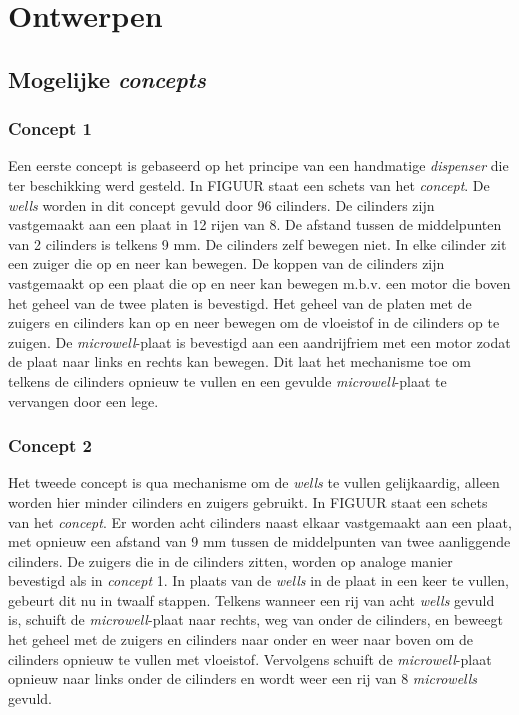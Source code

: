 \documentclass{article}
\begin{document}
{{\section{Ontwerpen}
\subsection{Mogelijke \textit{concepts}}
\subsubsection{Concept 1}
Een eerste concept is gebaseerd op het principe van een handmatige \textit{dispenser} die ter beschikking werd gesteld. In FIGUUR staat een schets van het \textit{concept}. De \textit{wells} worden in dit concept gevuld door 96 cilinders. De cilinders zijn vastgemaakt aan een plaat in 12 rijen van 8. De afstand tussen de middelpunten van 2 cilinders is telkens 9 mm. De cilinders zelf bewegen niet. In elke cilinder zit een zuiger die op en neer kan bewegen. De koppen van de cilinders zijn vastgemaakt op een plaat die op en neer kan bewegen m.b.v. een motor die boven het geheel van de twee platen is bevestigd. Het geheel van de platen met de zuigers en cilinders kan op en neer bewegen om de vloeistof in de cilinders op te zuigen. De \textit{microwell}-plaat is bevestigd aan een aandrijfriem met een motor zodat de plaat naar links en rechts kan bewegen. Dit laat het mechanisme toe om telkens de cilinders opnieuw te vullen en een gevulde \textit{microwell}-plaat te vervangen door een lege.  

\subsubsection{Concept 2}
Het tweede concept is qua mechanisme om de \textit{wells} te vullen gelijkaardig, alleen worden hier minder cilinders en zuigers gebruikt. In FIGUUR staat een schets van het \textit{concept}. Er worden acht cilinders naast elkaar vastgemaakt aan een plaat, met opnieuw een afstand van 9 mm tussen de middelpunten van twee aanliggende cilinders. De zuigers die in de cilinders zitten, worden op analoge manier bevestigd als in \textit{concept} 1. In plaats van de \textit{wells} in de plaat in een keer te vullen, gebeurt dit nu in twaalf stappen. Telkens wanneer een rij van acht \textit{wells} gevuld is, schuift de \textit{microwell}-plaat naar rechts, weg van onder de cilinders, en beweegt het geheel met de zuigers en cilinders naar onder en weer naar boven om de cilinders opnieuw te vullen met vloeistof. Vervolgens schuift de \textit{microwell}-plaat opnieuw naar links onder de cilinders en wordt weer een rij van 8 \textit{microwells} gevuld.


}}
\end{document}

